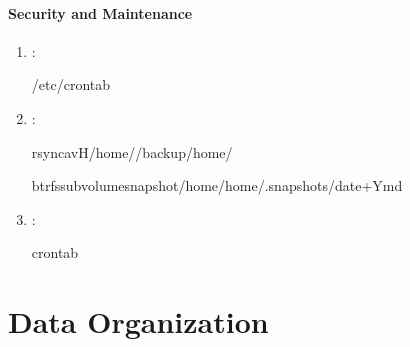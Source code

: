 \documentclass[letterpaper,10pt,english]{sphinxmanual}
\begin{document}
\subsubsection{Security and Maintenance}
\label{\detokenize{file-systems:security-and-maintenance}}\begin{enumerate}
%
\item {} 
\sphinxAtStartPar
{}:

\begin{sphinxVerbatim}[commandchars=\\\{\}]
\PYGZgt{}\PYGZgt{}/etc/crontab
\end{sphinxVerbatim}

\item {} 
\sphinxAtStartPar
{}:

\begin{sphinxVerbatim}[commandchars=\\\{\}]
rsync\PYGZhy{}avH/home//backup/home/

btrfssubvolumesnapshot/home/home/.snapshots/date+\PYGZpc{}Y\PYGZpc{}m\PYGZpc{}d
\end{sphinxVerbatim}

\item {} 
\sphinxAtStartPar
{}:

\begin{sphinxVerbatim}[commandchars=\\\{\}]
crontab\PYGZhy{}
\end{sphinxVerbatim}

\end{enumerate}

\sphinxstepscope


\chapter{Data Organization}
\label{\detokenize{data-organization:data-organization}}\label{\detokenize{data-organization::doc}}
\end{document}
